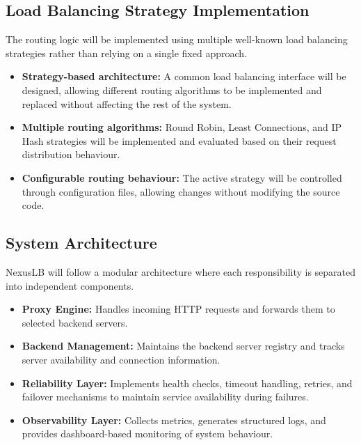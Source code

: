 \documentclass[11pt,a4paper]{article}
\begin{document}
\subsection{Load Balancing Strategy Implementation}

The routing logic will be implemented using multiple well-known load balancing strategies rather than relying on a single fixed approach.

\begin{itemize}
    \item \textbf{Strategy-based architecture:} A common load balancing interface will be designed, allowing different routing algorithms to be implemented and replaced without affecting the rest of the system.

    \item \textbf{Multiple routing algorithms:} Round Robin, Least Connections, and IP Hash strategies will be implemented and evaluated based on their request distribution behaviour.

    \item \textbf{Configurable routing behaviour:} The active strategy will be controlled through configuration files, allowing changes without modifying the source code.
\end{itemize}


\subsection{System Architecture}

NexusLB will follow a modular architecture where each responsibility is separated into independent components.

\begin{itemize}
    \item \textbf{Proxy Engine:} Handles incoming HTTP requests and forwards them to selected backend servers.

    \item \textbf{Backend Management:} Maintains the backend server registry and tracks server availability and connection information.

    \item \textbf{Reliability Layer:} Implements health checks, timeout handling, retries, and failover mechanisms to maintain service availability during failures.

    \item \textbf{Observability Layer:} Collects metrics, generates structured logs, and provides dashboard-based monitoring of system behaviour.
\end{itemize}
\end{document}
